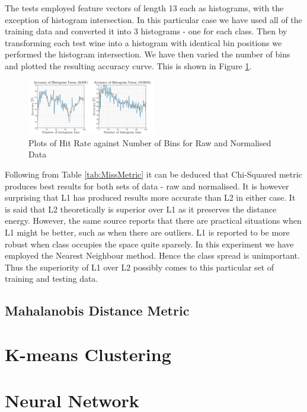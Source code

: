 \documentclass[10pt,twocolumn,letterpaper]{article}
\begin{document}
\vspace{-5mm}

The tests employed feature vectors of length 13 each as histograms, with the exception of histogram intersection. In this particular case we have used all of the training data and converted it into 3 histograms - one for each class. Then by transforming each test wine into a histogram with identical bin positions we performed the histogram intersection. We have then varied the number of bins and plotted the resulting accuracy curve. This is shown in Figure \ref{fig:hist}.

\begin{figure}[H]
\centering
\includegraphics[width=0.5\textwidth]{../results/Q1D_Hist}
\caption{Plots of Hit Rate against Number of Bins for Raw and Normalised Data
\label{fig:hist}}
\end{figure}

Following from Table \ref{tab:MissMetric} it can be deduced that Chi-Squared metric produces best results for both sets of data - raw and normalised. It is however surprising that L1 has produced results more accurate than L2 in either case. It is said \cite{L1L2} that L2 theoretically is superior over L1 as it preserves the distance energy. However, the same source reports that there are practical situations when L1 might be better, such as when there are outliers. L1 is reported to be more robust when class occupies the space quite sparsely. In this experiment we have employed the Nearest Neighbour method. Hence the class spread is unimportant. Thus the superiority of L1 over L2 possibly comes to this particular set of training and testing data.
\subsection{Mahalanobis Distance Metric}

\section{K-means Clustering}

\section{Neural Network}
\end{document}
